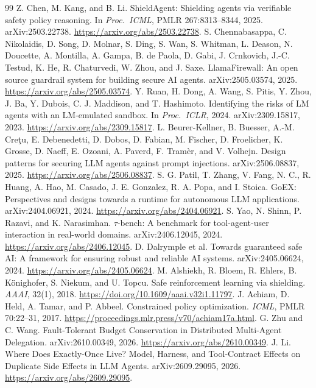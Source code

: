\begin{thebibliography}{99}
 Z. Chen, M. Kang, and B. Li. ShieldAgent: Shielding agents via verifiable safety policy reasoning. In \emph{Proc.\ ICML}, PMLR 267:8313--8344, 2025. arXiv:2503.22738. \url{https://arxiv.org/abs/2503.22738}.
 S. Chennabasappa, C. Nikolaidis, D. Song, D. Molnar, S. Ding, S. Wan, S. Whitman, L. Deason, N. Doucette, A. Montilla, A. Gampa, B. de Paola, D. Gabi, J. Crnkovich, J.-C. Testud, K. He, R. Chaturvedi, W. Zhou, and J. Saxe. LlamaFirewall: An open source guardrail system for building secure AI agents. arXiv:2505.03574, 2025. \url{https://arxiv.org/abs/2505.03574}.
 Y. Ruan, H. Dong, A. Wang, S. Pitis, Y. Zhou, J. Ba, Y. Dubois, C. J. Maddison, and T. Hashimoto. Identifying the risks of LM agents with an LM-emulated sandbox. In \emph{Proc.\ ICLR}, 2024. arXiv:2309.15817, 2023. \url{https://arxiv.org/abs/2309.15817}.
 L. Beurer-Kellner, B. Buesser, A.-M. Cre\c{t}u, E. Debenedetti, D. Dobos, D. Fabian, M. Fischer, D. Froelicher, K. Grosse, D. Naeff, E. Ozoani, A. Paverd, F. Tram\`er, and V. Volhejn. Design patterns for securing LLM agents against prompt injections. arXiv:2506.08837, 2025. \url{https://arxiv.org/abs/2506.08837}.
 S. G. Patil, T. Zhang, V. Fang, N. C., R. Huang, A. Hao, M. Casado, J. E. Gonzalez, R. A. Popa, and I. Stoica. GoEX: Perspectives and designs towards a runtime for autonomous LLM applications. arXiv:2404.06921, 2024. \url{https://arxiv.org/abs/2404.06921}.
 S. Yao, N. Shinn, P. Razavi, and K. Narasimhan. \(\tau\)-bench: A benchmark for tool-agent-user interaction in real-world domains. arXiv:2406.12045, 2024. \url{https://arxiv.org/abs/2406.12045}.
 D. Dalrymple et al. Towards guaranteed safe AI: A framework for ensuring robust and reliable AI systems. arXiv:2405.06624, 2024. \url{https://arxiv.org/abs/2405.06624}.
 M. Alshiekh, R. Bloem, R. Ehlers, B. K\"onighofer, S. Niekum, and U. Topcu. Safe reinforcement learning via shielding. \emph{AAAI}, 32(1), 2018. \url{https://doi.org/10.1609/aaai.v32i1.11797}.
 J. Achiam, D. Held, A. Tamar, and P. Abbeel. Constrained policy optimization. \emph{ICML}, PMLR 70:22--31, 2017. \url{https://proceedings.mlr.press/v70/achiam17a.html}.
 G. Zhu and C. Wang. Fault-Tolerant Budget Conservation in Distributed Multi-Agent Delegation. arXiv:2610.00349, 2026. \url{https://arxiv.org/abs/2610.00349}.
 J. Li. Where Does Exactly-Once Live? Model, Harness, and Tool-Contract Effects on Duplicate Side Effects in LLM Agents. arXiv:2609.29095, 2026. \url{https://arxiv.org/abs/2609.29095}.

\end{thebibliography}
